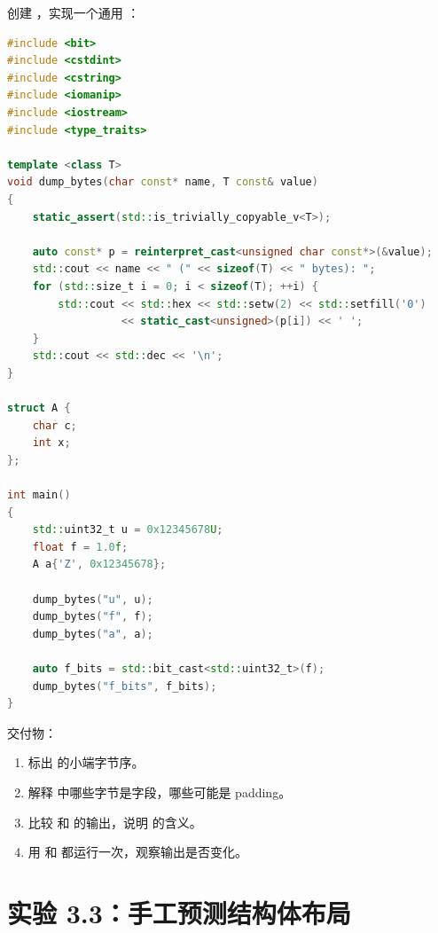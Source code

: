 \begin{labbox}
创建 ，实现一个通用 ：

\begin{lstlisting}[language=C++]
#include <bit>
#include <cstdint>
#include <cstring>
#include <iomanip>
#include <iostream>
#include <type_traits>

template <class T>
void dump_bytes(char const* name, T const& value)
{
    static_assert(std::is_trivially_copyable_v<T>);

    auto const* p = reinterpret_cast<unsigned char const*>(&value);
    std::cout << name << " (" << sizeof(T) << " bytes): ";
    for (std::size_t i = 0; i < sizeof(T); ++i) {
        std::cout << std::hex << std::setw(2) << std::setfill('0')
                  << static_cast<unsigned>(p[i]) << ' ';
    }
    std::cout << std::dec << '\n';
}

struct A {
    char c;
    int x;
};

int main()
{
    std::uint32_t u = 0x12345678U;
    float f = 1.0f;
    A a{'Z', 0x12345678};

    dump_bytes("u", u);
    dump_bytes("f", f);
    dump_bytes("a", a);

    auto f_bits = std::bit_cast<std::uint32_t>(f);
    dump_bytes("f_bits", f_bits);
}
\end{lstlisting}

交付物：

\begin{enumerate}
  \item 标出  的小端字节序。
  \item 解释  中哪些字节是字段，哪些可能是 padding。
  \item 比较  和  的输出，说明  的含义。
  \item 用  和  都运行一次，观察输出是否变化。
\end{enumerate}
\end{labbox}

\section{实验 3.3：手工预测结构体布局}

